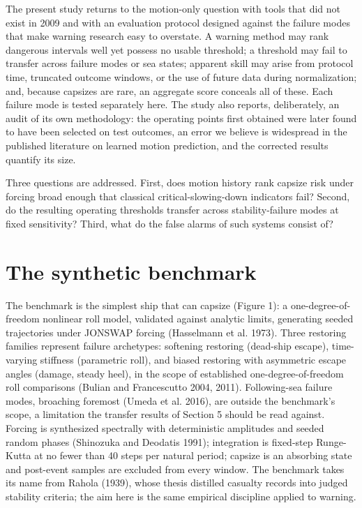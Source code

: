 \documentclass[11pt]{article}
\begin{document}
The present study returns to the motion-only question with tools that did not exist in 2009 and
with an evaluation protocol designed against the failure modes that make warning research easy to
overstate. A warning method may rank dangerous intervals well yet possess no usable threshold; a
threshold may fail to transfer across failure modes or sea states; apparent skill may arise from
protocol time, truncated outcome windows, or the use of future data during normalization; and,
because capsizes are rare, an aggregate score conceals all of these. Each failure mode is tested
separately here. The study also reports, deliberately, an audit of its own methodology: the
operating points first obtained were later found to have been selected on test outcomes, an error
we believe is widespread in the published literature on learned motion prediction, and
the corrected results quantify its size.

Three questions are addressed. First, does motion history rank capsize risk under forcing broad
enough that classical critical-slowing-down indicators fail? Second, do the resulting operating
thresholds transfer across stability-failure modes at fixed sensitivity? Third, what do the false
alarms of such systems consist of?

\section{The synthetic benchmark}

The benchmark is the simplest ship that can capsize (Figure 1): a one-degree-of-freedom
nonlinear roll model, validated against analytic limits, generating seeded trajectories under
JONSWAP forcing (Hasselmann et al. 1973). Three restoring
families represent failure archetypes: softening restoring (dead-ship escape), time-varying
stiffness (parametric roll), and biased restoring with asymmetric escape angles (damage, steady
heel), in the scope of established one-degree-of-freedom roll comparisons (Bulian and
Francescutto 2004, 2011). Following-sea failure modes, broaching foremost (Umeda et al. 2016),
are outside the benchmark's scope, a limitation the transfer results of Section 5 should be read
against. Forcing is synthesized spectrally with deterministic amplitudes and
seeded random phases (Shinozuka and Deodatis 1991); integration is fixed-step Runge-Kutta at no
fewer than 40 steps per natural period; capsize is an absorbing state and post-event samples are
excluded from every window. The benchmark takes its name from Rahola (1939), whose thesis
distilled casualty records into judged stability criteria; the aim here is the same empirical
discipline applied to warning.
\end{document}
